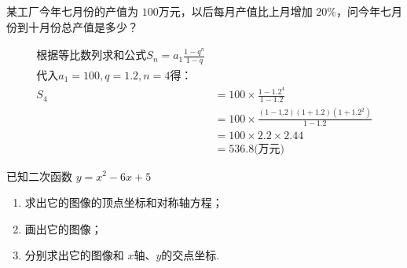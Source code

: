 \documentclass[answers]{exam}
\begin{document}
\begin{questions}
	\question 某工厂今年七月份的产值为 \( 100 \)万元，以后每月产值比上月增加 \( 20\%
	\)，问今年七月份到十月份总产值是多少？

	\begin{solution}
		\begin{align*}
			\text{根据等比数列求和公式} S_n = a_1\frac{1- q^n}{1-q}                    \\
			\text{代入}  a_1 = 100, q = 1.2, n = 4  \text{得：}                  \\
			S_4 & = 100 \times \frac{1 - 1.2^4}{1 - 1.2}                     \\
			    & = 100 \times \frac{(1 - 1.2)(1 + 1.2)(1 + 1.2^2)}{1 - 1.2} \\
			    & = 100 \times 2.2 \times 2.44                               \\
			    & = 536.8 \text{(万元)}
		\end{align*}

	\end{solution}

	\question 已知二次函数 \( y = x^2 - 6x + 5 \)
	\begin{enumerate}[label=(\arabic*)]
		\item 求出它的图像的顶点坐标和对称轴方程；
		\item 画出它的图像；
		\item 分别求出它的图像和 \( x \)轴、$ y $的交点坐标.
	\end{enumerate}


\end{questions}
\end{document}
